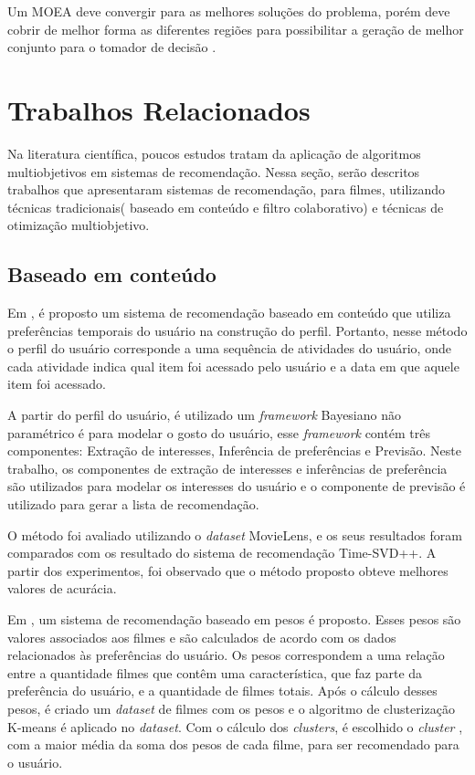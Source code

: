 Um MOEA deve convergir para as melhores soluções do problema, porém deve cobrir de melhor forma as diferentes regiões para possibilitar a geração de melhor conjunto para o tomador de decisão \cite{carvalho2013novas}.  


\section{Trabalhos Relacionados}
Na literatura científica, poucos estudos tratam da aplicação de algoritmos multiobjetivos em sistemas de recomendação. Nessa seção, serão descritos trabalhos que apresentaram sistemas de recomendação, para filmes, utilizando técnicas tradicionais( baseado em conteúdo e filtro colaborativo) e técnicas de otimização multiobjetivo.
\subsection{Baseado em conteúdo}
Em \cite{cami2017content}, é proposto um sistema de recomendação baseado em conteúdo que utiliza preferências temporais do usuário na construção  do perfil. Portanto, nesse método o perfil do usuário corresponde a uma sequência de atividades do usuário, onde cada atividade indica qual item foi acessado pelo usuário e a data em que aquele item foi acessado.
	
A partir do perfil do usuário, é utilizado um \textit{framework} Bayesiano não paramétrico é para modelar o gosto do usuário, esse \textit{framework} contém três componentes: Extração de interesses, Inferência de preferências e Previsão. Neste trabalho, os componentes de extração de interesses e inferências de preferência são utilizados para modelar os interesses do usuário e o componente de previsão é utilizado para gerar a lista de recomendação. 

O método foi avaliado utilizando o \textit{dataset} MovieLens, e os seus resultados foram comparados  com os resultado do sistema de recomendação Time-SVD++. A partir dos experimentos, foi observado que o método proposto obteve melhores valores de acurácia.

Em \cite{himel2017weight}, um sistema de recomendação baseado em pesos é proposto. Esses pesos são valores associados aos filmes e são calculados de acordo com os dados relacionados às preferências do usuário.  Os pesos correspondem a uma relação entre a quantidade filmes que contêm uma característica, que faz parte da preferência do usuário, e a quantidade de filmes totais. Após o cálculo desses pesos,  é criado um \textit{dataset} de filmes com os pesos e o algoritmo de clusterização K-means é aplicado no \textit{dataset}.  Com o cálculo dos \textit{clusters}, é escolhido o \textit{cluster} , com a maior média da soma dos pesos de cada filme, para ser recomendado para o usuário.


